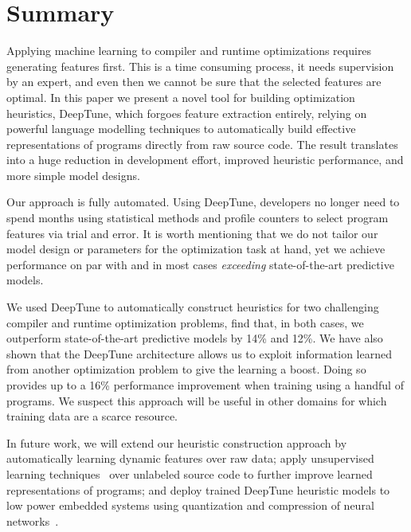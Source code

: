 \section{Summary}%
\label{sec:conclusion}

Applying machine learning to compiler and runtime optimizations requires generating features first. This is a time consuming process, it needs supervision by an expert, and even then we cannot be sure that the selected features are optimal. In this paper we present a novel tool for building optimization heuristics, DeepTune, which forgoes feature extraction entirely, relying on powerful language modelling techniques to automatically build effective representations of programs directly from raw source code. The result translates into a huge reduction in development effort, improved heuristic performance, and more simple model designs.

Our approach is fully automated. Using DeepTune, developers no longer need to spend months using statistical methods and profile counters to select program features via trial and error. It is worth mentioning that we do not tailor our model design or parameters for the optimization task at hand, yet we achieve performance on par with and in most cases \emph{exceeding} state-of-the-art predictive models.

We used DeepTune to automatically construct heuristics for two challenging compiler and runtime optimization problems, find that, in both cases, we outperform state-of-the-art predictive models by 14\% and 12\%. We have also shown that the DeepTune architecture allows us to exploit information learned from another optimization problem to give the learning a boost. Doing so provides up to a 16\% performance improvement when training using a handful of programs. We suspect this approach will be useful in other domains for which training data are a scarce resource.

In future work, we will extend our heuristic construction approach by automatically learning dynamic features over raw data; apply unsupervised learning techniques~\cite{Le2012} over unlabeled source code to further improve learned representations of programs; and deploy trained DeepTune heuristic models to low power embedded systems using quantization and compression of neural networks~\cite{Han2015}.
